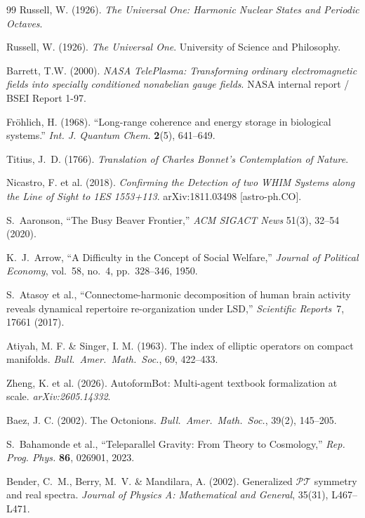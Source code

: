 \begin{thebibliography}{99}
Russell, W. (1926).
\textit{The Universal One: Harmonic Nuclear States and Periodic Octaves}.

Russell, W. (1926).
\textit{The Universal One}. University of Science and Philosophy.

Barrett, T.W. (2000).
\textit{NASA TelePlasma: Transforming ordinary electromagnetic fields into specially conditioned nonabelian gauge fields}.
NASA internal report / BSEI Report 1-97.

Fr\"ohlich, H. (1968).
``Long-range coherence and energy storage in biological systems.''
\textit{Int. J. Quantum Chem.} \textbf{2}(5), 641--649.

Titius, J.~D. (1766).
\textit{Translation of Charles Bonnet's Contemplation of Nature}.

Nicastro, F. et al. (2018).
\textit{Confirming the Detection of two WHIM Systems along the Line of Sight to 1ES 1553+113}.
arXiv:1811.03498 [astro-ph.CO].

S.~Aaronson,
``The Busy Beaver Frontier,''
\emph{ACM SIGACT News} 51(3), 32--54 (2020).

K.~J.~Arrow,
``A Difficulty in the Concept of Social Welfare,''
\emph{Journal of Political Economy}, vol.~58, no.~4, pp.~328--346, 1950.

 S.~Atasoy et al., ``Connectome-harmonic decomposition of human brain activity reveals dynamical repertoire re-organization under LSD,'' \emph{Scientific Reports}\ 7, 17661 (2017).

 Atiyah, M. F. \& Singer, I. M. (1963). The index of elliptic operators on compact manifolds. \emph{Bull.\ Amer.\ Math.\ Soc.}, 69, 422--433.

 Zheng, K. et al. (2026). AutoformBot: Multi-agent textbook formalization at scale. \emph{arXiv:2605.14332}.

 Baez, J. C. (2002). The Octonions. \emph{Bull.\ Amer.\ Math.\ Soc.}, 39(2), 145--205.

S.~Bahamonde et al., ``Teleparallel Gravity: From Theory to Cosmology,'' \emph{Rep. Prog. Phys.} \textbf{86}, 026901, 2023.

Bender, C.~M., Berry, M.~V. \& Mandilara, A. (2002).
Generalized $\mathcal{PT}$ symmetry and real spectra.
\emph{Journal of Physics A: Mathematical and General}, 35(31), L467--L471.


\end{thebibliography}
